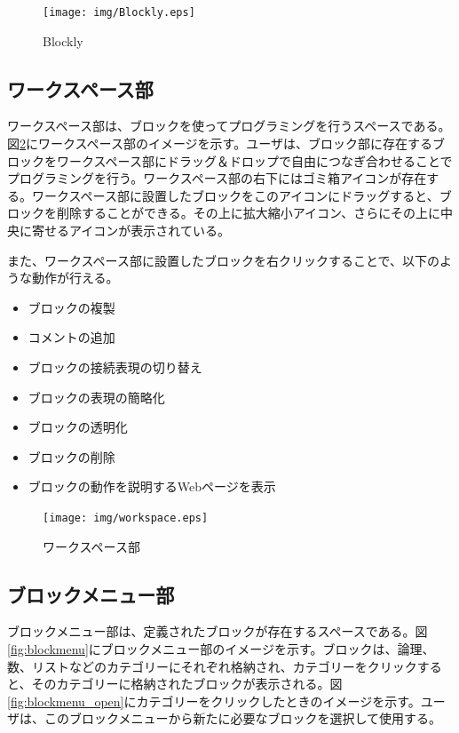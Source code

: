 \documentclass{risepaper}
\begin{document}
\begin{figure}[h]
\begin{center}
\texttt{[image: img/Blockly.eps]}
\caption{Blockly}%
\label{fig:Blockly}
\end{center}%
\end{figure}%

   \subsection{ワークスペース部}

ワークスペース部は、ブロックを使ってプログラミングを行うスペースである。図\ref{fig:workspace}にワークスペース部のイメージを示す。ユーザは、ブロック部に存在するブロックをワークスペース部にドラッグ＆ドロップで自由につなぎ合わせることでプログラミングを行う。ワークスペース部の右下にはゴミ箱アイコンが存在する。ワークスペース部に設置したブロックをこのアイコンにドラッグすると、ブロックを削除することができる。その上に拡大縮小アイコン、さらにその上に中央に寄せるアイコンが表示されている。

また、ワークスペース部に設置したブロックを右クリックすることで、以下のような動作が行える。

\begin{itemize}
\item ブロックの複製
\item コメントの追加
\item ブロックの接続表現の切り替え
\item ブロックの表現の簡略化
\item ブロックの透明化
\item ブロックの削除
\item ブロックの動作を説明するWebページを表示
\end{itemize} 
   
\begin{figure}[h]
\begin{center}
\texttt{[image: img/workspace.eps]}
\caption{ワークスペース部}%
\label{fig:workspace}
\end{center}%
\end{figure}%

   \subsection{ブロックメニュー部}
   
ブロックメニュー部は、定義されたブロックが存在するスペースである。図\ref{fig:blockmenu}にブロックメニュー部のイメージを示す。ブロックは、論理、数、リストなどのカテゴリーにそれぞれ格納され、カテゴリーをクリックすると、そのカテゴリーに格納されたブロックが表示される。図\ref{fig:blockmenu_open}にカテゴリーをクリックしたときのイメージを示す。ユーザは、このブロックメニューから新たに必要なブロックを選択して使用する。
\end{document}
